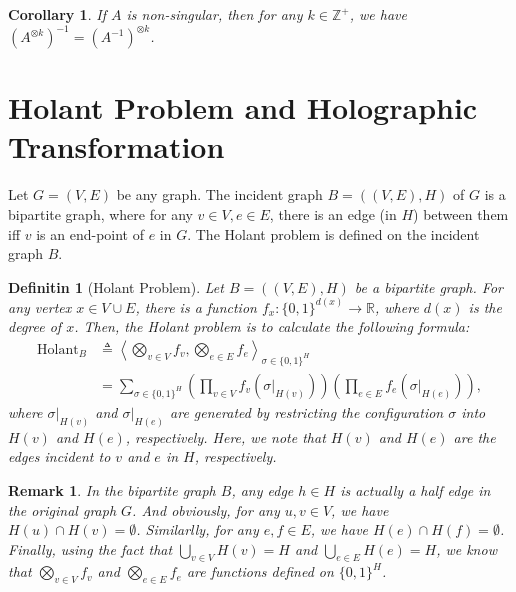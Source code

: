 \documentclass{article}
\newtheorem{definition}{Definitin}[section]
\newtheorem{corollary}{Corollary}[section]
\newtheorem{remark}{Remark}[section]
\def\<{\left\langle}
\def\>{\right\rangle}
\begin{document}
\begin{corollary}
  If $A$ is non-singular, then for any $k \in \mathbb{Z}^+$, we have $\left(A^{\otimes k}\right)^{-1} = \left(A^{-1}\right)^{\otimes k}$.
\end{corollary}

\section{Holant Problem and Holographic Transformation}
Let $G = (V, E)$ be any graph.
The incident graph $B = ((V, E), H)$ of $G$ is a bipartite graph, where for any $v\in V, e \in E$, there is an edge (in $H$) between them iff $v$ is an end-point of $e$ in $G$.
The Holant problem is defined on the incident graph $B$.

\begin{definition}[Holant Problem]
  Let $B = ((V, E), H)$ be a bipartite graph.
  For any vertex $x \in V\cup E$, there is a function $f_x: \{0, 1\}^{d(x)} \to \mathbb{R}$, where $d(x)$ is the degree of $x$.
  Then, the Holant problem is to calculate the following formula:
  \begin{align*}
    \mathrm{Holant}_B
    &\triangleq \<\bigotimes_{v\in V}f_v, \bigotimes_{e\in E} f_e\>_{\sigma \in \{0, 1\}^H} \\
    &= \sum_{\sigma \in \{0, 1\}^H} \left(\prod_{v\in V}f_v(\sigma |_{H(v)})\right) \left(\prod_{e\in E}f_e(\sigma |_{H(e)})\right),
  \end{align*}
  where $\sigma |_{H(v)}$ and $\sigma |_{H(e)}$ are generated by restricting the configuration $\sigma$ into $H(v)$ and $H(e)$, respectively.
  Here, we note that $H(v)$ and $H(e)$ are the edges incident to $v$ and $e$ in $H$, respectively.
\end{definition}

\begin{remark}
  In the bipartite graph $B$, any edge $h \in H$ is actually a half edge in the original graph $G$.
  And obviously, for any $u, v\in V$, we have $H(u) \cap H(v) = \emptyset$.
  Similarlly, for any $e, f \in E$, we have $H(e) \cap H(f) = \emptyset$.
  Finally, using the fact that $\bigcup_{v\in V}H(v) = H$ and $\bigcup_{e\in E}H(e) = H$, we know that $\bigotimes_{v\in V}f_v$ and $\bigotimes_{e\in E}f_e$ are functions defined on $\{0, 1\}^H$.
\end{remark}
\end{document}

